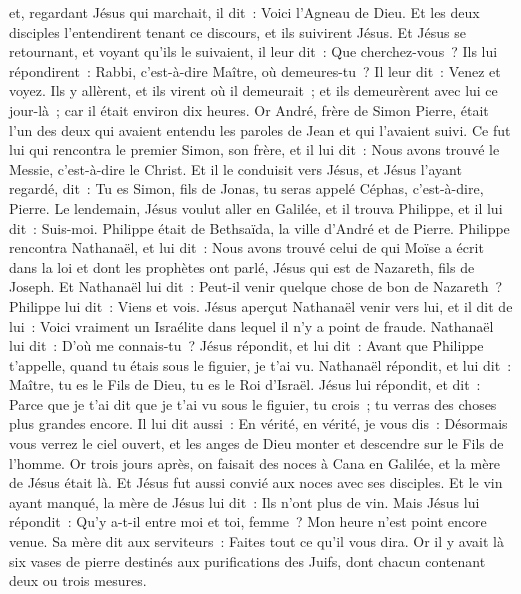 \begin{multicols}{2}
et, regardant Jésus qui marchait, il dit~: Voici l'Agneau de Dieu.
Et les deux disciples l'entendirent tenant ce discours, et ils suivirent Jésus.
Et Jésus se retournant, et voyant qu'ils le suivaient, il leur dit~: Que cherchez-vous~? Ils lui répondirent~: Rabbi, c'est-à-dire Maître, où demeures-tu~?
Il leur dit~: Venez et voyez. Ils y allèrent, et ils virent où il demeurait~; et ils demeurèrent avec lui ce jour-là~; car il était environ dix heures.
Or André, frère de Simon Pierre, était l'un des deux qui avaient entendu les paroles de Jean et qui l'avaient suivi.
Ce fut lui qui rencontra le premier Simon, son frère, et il lui dit~: Nous avons trouvé le Messie, c'est-à-dire le Christ.
Et il le conduisit vers Jésus, et Jésus l'ayant regardé, dit~: Tu es Simon, fils de Jonas, tu seras appelé Céphas, c'est-à-dire, Pierre.
Le lendemain, Jésus voulut aller en Galilée, et il trouva Philippe, et il lui dit~: Suis-moi.
Philippe était de Bethsaïda, la ville d'André et de Pierre.
Philippe rencontra Nathanaël, et lui dit~: Nous avons trouvé celui de qui Moïse a écrit dans la loi et dont les prophètes ont parlé, Jésus qui est de Nazareth, fils de Joseph.
Et Nathanaël lui dit~: Peut-il venir quelque chose de bon de Nazareth~? Philippe lui dit~: Viens et vois.
Jésus aperçut Nathanaël venir vers lui, et il dit de lui~: Voici vraiment un Israélite dans lequel il n'y a point de fraude.
Nathanaël lui dit~: D'où me connais-tu~? Jésus répondit, et lui dit~: Avant que Philippe t'appelle, quand tu étais sous le figuier, je t'ai vu.
Nathanaël répondit, et lui dit~: Maître, tu es le Fils de Dieu, tu es le Roi d'Israël.
Jésus lui répondit, et dit~: Parce que je t'ai dit que je t'ai vu sous le figuier, tu crois~; tu verras des choses plus grandes encore.
Il lui dit aussi~: En vérité, en vérité, je vous dis~: Désormais vous verrez le ciel ouvert, et les anges de Dieu monter et descendre sur le Fils de l'homme.
\VerseOne{}Or trois jours après, on faisait des noces à Cana en Galilée, et la mère de Jésus était là.
Et Jésus fut aussi convié aux noces avec ses disciples.
Et le vin ayant manqué, la mère de Jésus lui dit~: Ils n'ont plus de vin.
Mais Jésus lui répondit~: Qu'y a-t-il entre moi et toi, femme~? Mon heure n'est point encore venue.
Sa mère dit aux serviteurs~: Faites tout ce qu'il vous dira.
Or il y avait là six vases de pierre destinés aux purifications des Juifs, dont chacun contenant deux ou trois mesures.

\end{multicols}
